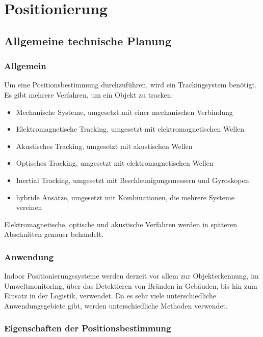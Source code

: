 \chapter{Positionierung}
\renewcommand{\kapitelautor}{Autor: Christina Bornberg}

\section{Allgemeine technische Planung}

    \subsection{Allgemein}
    Um eine Positionsbestimmung durchzuführen, wird ein Trackingsystem benötigt.
    Es gibt mehrere Verfahren\cite{PositionAllg}, um ein Objekt zu tracken: 
    \begin{itemize}
    \item Mechanische Systeme, umgesetzt mit einer mechanischen Verbindung
    \item Elektromagnetische Tracking, umgesetzt mit elektromagnetischen Wellen
    \item Akustisches Tracking, umgesetzt mit akustischen Wellen
    \item Optisches Tracking, umgesetzt mit elektromagnetischen Wellen
    \item Inertial Tracking, umgesetzt mit Beschleunigungsmessern und Gyroskopen
    \item hybride Ansätze, umgesetzt mit Kombinationen, die mehrere Systeme vereinen
    \end{itemize}
    Elektromagnetische, optische und akustische Verfahren werden in späteren Abschnitten genauer behandelt.

    \subsection{Anwendung}
    Indoor Positionierungssysteme werden derzeit vor allem zur Objekterkennung, im Umweltmonitoring, über das Detektieren von Bränden in Gebäuden, bis hin zum Einsatz in der Logistik, verwendet. Da es sehr viele unterschiedliche Anwendungsgebiete\cite{posAnwendung} gibt, werden unterschiedliche Methoden verwendet.

    \subsection{Eigenschaften der Positionsbestimmung}

